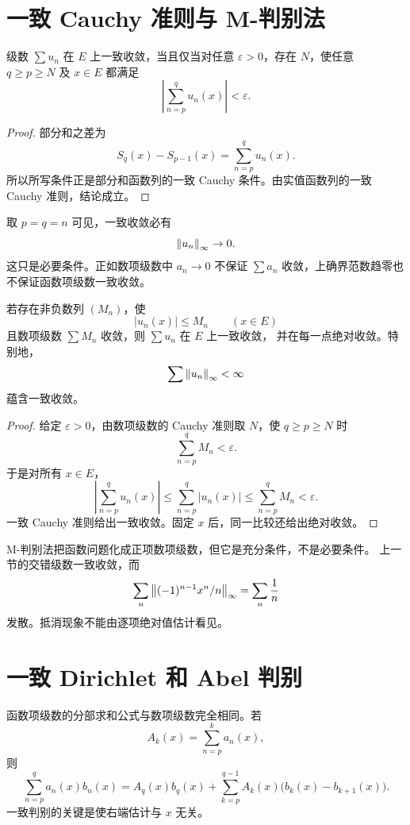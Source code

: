 \section{一致 Cauchy 准则与 M-判别法}

\begin{theorem}
\label{thm:function-series-uniform-cauchy}
级数 \(\sum u_n\) 在 \(E\) 上一致收敛，当且仅当对任意
\(\varepsilon>0\)，存在 \(N\)，使任意 \(q\ge p\ge N\) 及
\(x\in E\) 都满足
\[
 \left|\sum_{n=p}^q u_n(x)\right|<\varepsilon.
\]
\end{theorem}

\begin{proof}
部分和之差为
\[
 S_q(x)-S_{p-1}(x)=\sum_{n=p}^q u_n(x).
\]
所以所写条件正是部分和函数列的一致 Cauchy 条件。由实值函数列的一致
Cauchy 准则，结论成立。
\end{proof}

取 \(p=q=n\) 可见，一致收敛必有
\[
 \left\lVert u_n\right\rVert_\infty\to0.
\]
这只是必要条件。正如数项级数中 \(a_n\to0\) 不保证 \(\sum a_n\)
收敛，上确界范数趋零也不保证函数项级数一致收敛。

\begin{theorem}
\label{thm:weierstrass-m-test}
若存在非负数列 \((M_n)\)，使
\[
 |u_n(x)|\le M_n\qquad(x\in E)
\]
且数项级数 \(\sum M_n\) 收敛，则 \(\sum u_n\) 在 \(E\) 上一致收敛，
并在每一点绝对收敛。特别地，
\[
 \sum\left\lVert u_n\right\rVert_\infty<\infty
\]
蕴含一致收敛。
\end{theorem}

\begin{proof}
给定 \(\varepsilon>0\)，由数项级数的 Cauchy 准则取 \(N\)，使
\(q\ge p\ge N\) 时
\[
 \sum_{n=p}^qM_n<\varepsilon.
\]
于是对所有 \(x\in E\)，
\[
 \left|\sum_{n=p}^q u_n(x)\right|
 \le\sum_{n=p}^q|u_n(x)|
 \le\sum_{n=p}^qM_n<\varepsilon.
\]
一致 Cauchy 准则给出一致收敛。固定 \(x\) 后，同一比较还给出绝对收敛。
\end{proof}

M-判别法把函数问题化成正项数项级数，但它是充分条件，不是必要条件。
上一节的交错级数一致收敛，而
\[
 \sum_n\left\lVert(-1)^{n-1}x^n/n\right\rVert_\infty=\sum_n\frac1n
\]
发散。抵消现象不能由逐项绝对值估计看见。

\section{一致 Dirichlet 和 Abel 判别}

函数项级数的分部求和公式与数项级数完全相同。若
\[
 A_k(x)=\sum_{n=p}^k a_n(x),
\]
则
\begin{equation}
\label{eq:uniform-abel-summation}
 \sum_{n=p}^q a_n(x)b_n(x)
 =A_q(x)b_q(x)
  +\sum_{k=p}^{q-1}A_k(x)\bigl(b_k(x)-b_{k+1}(x)\bigr).
\end{equation}
一致判别的关键是使右端估计与 \(x\) 无关。

